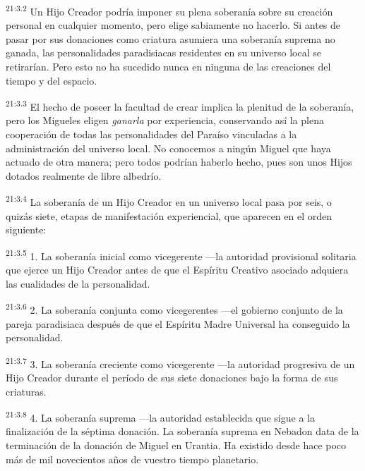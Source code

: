 \par
\textsuperscript{21:3.2} Un Hijo Creador podría imponer su plena soberanía sobre su creación personal en cualquier momento, pero elige sabiamente no hacerlo. Si antes de pasar por sus donaciones como criatura asumiera una soberanía suprema no ganada, las personalidades paradisiacas residentes en su universo local se retirarían. Pero esto no ha sucedido nunca en ninguna de las creaciones del tiempo y del espacio.

\par
\textsuperscript{21:3.3} El hecho de poseer la facultad de crear implica la plenitud de la soberanía, pero los Migueles eligen \textit{ganarla} por experiencia, conservando así la plena cooperación de todas las personalidades del Paraíso vinculadas a la administración del universo local. No conocemos a ningún Miguel que haya actuado de otra manera; pero todos podrían haberlo hecho, pues son unos Hijos dotados realmente de libre albedrío.

\par
\textsuperscript{21:3.4} La soberanía de un Hijo Creador en un universo local pasa por seis, o quizás siete, etapas de manifestación experiencial, que aparecen en el orden siguiente:

\par
\textsuperscript{21:3.5} 1. La soberanía inicial como vicegerente ---la autoridad provisional solitaria que ejerce un Hijo Creador antes de que el Espíritu Creativo asociado adquiera las cualidades de la personalidad.

\par
\textsuperscript{21:3.6} 2. La soberanía conjunta como vicegerentes ---el gobierno conjunto de la pareja paradisiaca después de que el Espíritu Madre Universal ha conseguido la personalidad.

\par
\textsuperscript{21:3.7} 3. La soberanía creciente como vicegerente ---la autoridad progresiva de un Hijo Creador durante el período de sus siete donaciones bajo la forma de sus criaturas.

\par
\textsuperscript{21:3.8} 4. La soberanía suprema ---la autoridad establecida que sigue a la finalización de la séptima donación. La soberanía suprema en Nebadon data de la terminación de la donación de Miguel en Urantia. Ha existido desde hace poco más de mil novecientos años de vuestro tiempo planetario.

